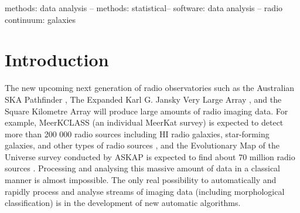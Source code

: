 \documentclass[fleqn,usenatbib]{mnras}
\begin{document}
\begin{keywords}
methods: data analysis -- methods: statistical-- software: data analysis -- radio continuum: galaxies
\end{keywords}



\section{Introduction}
\label{intro}
The new upcoming next generation of radio observatories such as the Australian SKA Pathfinder \cite[ASKAP;][]{Johnston2007,Johnston2008,Johnston2009}, The Expanded Karl G. Jansky Very Large Array \cite[EVLA;][]{Perley2011}, and the Square Kilometre Array \cite[SKA;][]{Braun2015, Quinn2015, dewdney2009square}  will produce large amounts of radio imaging data. For example, MeerKCLASS (an individual MeerKat survey) is expected to detect more than 200 000 radio sources including HI radio galaxies, star-forming galaxies, and other types of radio sources \citep{Santos2017}, and the Evolutionary Map of the Universe \cite[EMU;][]{Hopkins2015} survey  conducted by ASKAP is expected to find about 70 million radio sources \citep{Norris2011}. Processing and analysing this massive amount of data in a classical manner is almost impossible. The only real possibility to automatically and rapidly process and analyse streams of imaging data (including morphological classification) is in the development  of new automatic algorithms. 
\end{document}
